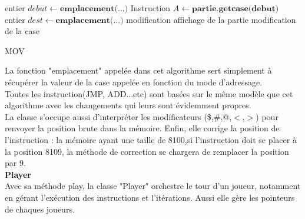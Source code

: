 \documentclass[a4paper,12pt]{article}
\begin{document}
\begin{algorithm}[H]
\DontPrintSemicolon
{}
entier $debut \gets \textbf{emplacement(...)}$\;
Instruction $A \gets \textbf{partie.getcase(debut)}$\;
entier $dest \gets \textbf{emplacement(...)}$\;
modification affichage de la partie\;
modification de la case \;
\caption{{\sc MOV}} 
\end{algorithm}
La fonction "emplacement" appelée dans cet algorithme sert simplement à récupérer la valeur de la case appelée en fonction du mode d'adressage.\\
Toutes les instruction(JMP, ADD...etc) sont basées sur le même modèle que cet algorithme avec les changements qui leurs sont évidemment propres.\\
La classe s'occupe aussi d'interpréter les modificateurs (\$,\#,@,$<$,$>$) pour renvoyer la position brute dans la mémoire. Enfin, elle corrige la position de l'instruction : la mémoire ayant une taille de 8100,si l'instruction doit se placer à la position 8109, la méthode de correction se chargera de remplacer la position par 9.\\
\textbf{Player}\\
Avec sa méthode play, la classe "Player" orchestre le tour d’un joueur, notamment en gérant l'exécution des instructions et l’itérations. 
Aussi elle gère les pointeurs de chaques joueurs.\\
\end{document}

